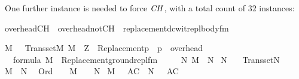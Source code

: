One further instance is needed to force $\mathit{CH}$, with a total count
of $32$ instances:%
\begin{isabelle}%
overhead{\isacharunderscore}{\kern0pt}CH\ {\isasymequiv}\ overhead{\isacharunderscore}{\kern0pt}notCH\ {\isasymunion}\ {\isacharbraceleft}{\kern0pt}replacement{\isacharunderscore}{\kern0pt}dcwit{\isacharunderscore}{\kern0pt}repl{\isacharunderscore}{\kern0pt}body{\isacharunderscore}{\kern0pt}fm{\isacharbraceright}{\kern0pt}%
\end{isabelle}%
\begin{isabelle}%
{\isasymlbrakk}M\ {\isasymapprox}\ {\isasymomega}{\isacharsemicolon}{\kern0pt}\ Transset{\isacharparenleft}{\kern0pt}M{\isacharparenright}{\kern0pt}{\isacharsemicolon}{\kern0pt}\ M\ {\isasymTurnstile}\ {\isasymcdot}Z{\isasymcdot}\ {\isasymunion}\ {\isacharbraceleft}{\kern0pt}{\isasymcdot}Replacement{\isacharparenleft}{\kern0pt}p{\isacharparenright}{\kern0pt}{\isasymcdot}\ {\isachardot}{\kern0pt}\ p\ {\isasymin}\ overhead{\isacharbraceright}{\kern0pt}{\isacharsemicolon}{\kern0pt}\isanewline
\isaindent{\ }{\isasymPhi}\ {\isasymsubseteq}\ formula{\isacharsemicolon}{\kern0pt}\ M\ {\isasymTurnstile}\ {\isacharbraceleft}{\kern0pt}{\isasymcdot}Replacement{\isacharparenleft}{\kern0pt}ground{\isacharunderscore}{\kern0pt}repl{\isacharunderscore}{\kern0pt}fm{\isacharparenleft}{\kern0pt}{\isasymphi}{\isacharparenright}{\kern0pt}{\isacharparenright}{\kern0pt}{\isasymcdot}\ {\isachardot}{\kern0pt}\ {\isasymphi}\ {\isasymin}\ {\isasymPhi}{\isacharbraceright}{\kern0pt}{\isasymrbrakk}\isanewline
{\isasymLongrightarrow}\ {\isasymexists}N{\isachardot}{\kern0pt}\ M\ {\isasymsubseteq}\ N\ {\isasymand}\isanewline
{}N\ {\isasymapprox}\ {\isasymomega}\ {\isasymand}\isanewline
{}Transset{\isacharparenleft}{\kern0pt}N{\isacharparenright}{\kern0pt}\ {\isasymand}\isanewline
{}M\ {\isasymnoteq}\ N\ {\isasymand}\isanewline
{}\ Ord{\isacharparenleft}{\kern0pt}{\isasymalpha}{\isacharparenright}{\kern0pt}\ {\isasymlongrightarrow}\ {\isasymalpha}\ {\isasymin}\ M\ {\isasymlongleftrightarrow}\ {\isasymalpha}\ {\isasymin}\ N{\isacharparenright}{\kern0pt}\ {\isasymand}\isanewline
{}M{\isacharcomma}{\kern0pt}\ {\isacharbrackleft}{\kern0pt}{\isacharbrackright}{\kern0pt}\ {\isasymTurnstile}\ {\isasymcdot}AC{\isasymcdot}{\isacharparenright}{\kern0pt}\ {\isasymlongrightarrow}\ N{\isacharcomma}{\kern0pt}\ {\isacharbrackleft}{\kern0pt}{\isacharbrackright}{\kern0pt}\ {\isasymTurnstile}\ {\isasymcdot}AC{\isasymcdot}{\isacharparenright}{\kern0pt}\ {\isasymand}\isanewline

\end{isabelle}

